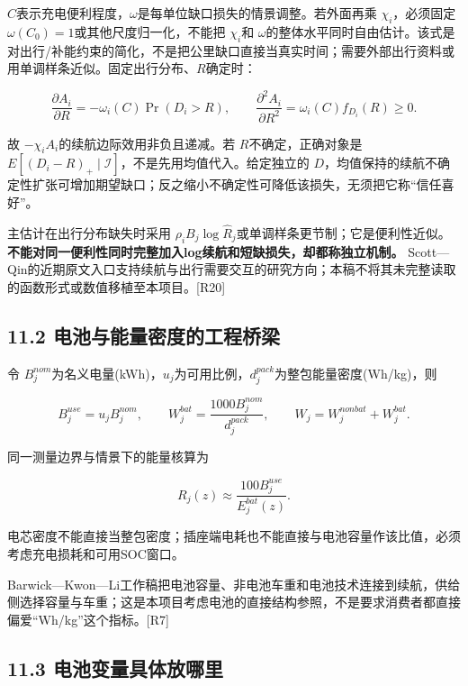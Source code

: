\documentclass[
  11pt,
]{article}
\begin{document}
\(C\)表示充电便利程度，\(\omega\)是每单位缺口损失的情景调整。若外面再乘
\(\chi_i\)，必须固定 \(\omega(C_0)=1\)或其他尺度归一化，不能把
\(\chi_i\)和
\(\omega\)的整体水平同时自由估计。该式是对出行/补能约束的简化，不是把公里缺口直接当真实时间；需要外部出行资料或用单调样条近似。固定出行分布、\(R\)确定时：

\[
\frac{\partial A_i}{\partial R}
=-\omega_i(C)\Pr(D_i>R),\qquad
\frac{\partial^2A_i}{\partial R^2}
=\omega_i(C)f_{D_i}(R)\geq0.
\tag{46}
\]

故 \(-\chi_i A_i\)的续航边际效用非负且递减。若 \(R\)不确定，正确对象是
\(E[(D_i-R)_+\mid\mathcal I]\)，不是先用均值代入。给定独立的
\(D\)，均值保持的续航不确定性扩张可增加期望缺口；反之缩小不确定性可降低该损失，无须把它称``信任喜好''。

主估计在出行分布缺失时采用
\(\rho_i B_j\log \widehat R_j\)或单调样条更节制；它是便利性近似。\textbf{不能对同一便利性同时完整加入log续航和短缺损失，却都称独立机制。}
Scott---Qin的近期原文入口支持续航与出行需要交互的研究方向；本稿不将其未完整读取的函数形式或数值移植至本项目。{[}R20{]}

\subsection{11.2
电池与能量密度的工程桥梁}\label{ux7535ux6c60ux4e0eux80fdux91cfux5bc6ux5ea6ux7684ux5de5ux7a0bux6865ux6881}

令
\(B_j^{nom}\)为名义电量(kWh)，\(u_j\)为可用比例，\(d_j^{pack}\)为整包能量密度(Wh/kg)，则

\[
B_j^{use}=u_jB_j^{nom},\qquad
W_j^{bat}=\frac{1000B_j^{nom}}{d_j^{pack}},\qquad
W_j=W_j^{nonbat}+W_j^{bat}.
\tag{47}
\]

同一测量边界与情景下的能量核算为

\[
R_j(z)\approx\frac{100B_j^{use}}{E_j^{bat}(z)}.
\tag{48}
\]

电芯密度不能直接当整包密度；插座端电耗也不能直接与电池容量作该比值，必须考虑充电损耗和可用SOC窗口。

Barwick---Kwon---Li工作稿把电池容量、非电池车重和电池技术连接到续航，供给侧选择容量与车重；这是本项目考虑电池的直接结构参照，不是要求消费者都直接偏爱``Wh/kg''这个指标。{[}R7{]}

\subsection{11.3
电池变量具体放哪里}\label{ux7535ux6c60ux53d8ux91cfux5177ux4f53ux653eux54eaux91cc}
\end{document}
